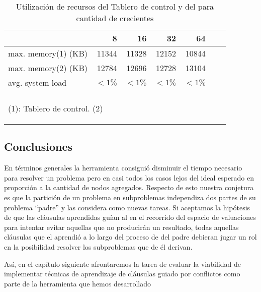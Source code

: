 \begin{table}
	\centering
	\begin{tabular}{lrrrrrr}
		
			\ws 				&	8 		&	16		&	32 		&	64	\\
		\toprule	
			max. memory(1) (KB)	&	11344	&	11328	&	12152	&	10844 \\
			max. memory(2) (KB)	&	12784	&	12696	&	12728 	&	13104 \\
			avg. system load	&	$<1\%$	&	$<1\%$	&	$<1\%$ 	&	$<1\%$ \\
		\bottomrule \\
		\multicolumn{5}{l}{\begin{tiny}(1): Tablero de control. (2) \master \end{tiny}}
	\end{tabular}
	\caption{Utilización de recursos del Tablero de control y del \master para cantidad de \ws crecientes}
	\label{tab:incremental}
\end{table}

\subsection{Conclusiones}

En términos generales la herramienta consiguió disminuir el tiempo necesario
para resolver un problema pero en casi todos los casos lejos del ideal
esperado en proporción a la cantidad de nodos agregados. Respecto de esto
nuestra conjetura es que la partición de un problema en subproblemas
independiza dos partes de su problema ``padre'' y las considera como nuevas
tareas. Si aceptamos la hipótesis de que las cláusulas aprendidas guían al
\ssolver en el recorrido del espacio de valuaciones para intentar evitar
aquellas que no producirán un resultado, todas aquellas cláusulas que el
\ssolver aprendió a lo largo del proceso de \solving del padre debieran jugar
un rol en la posibilidad resolver los subproblemas que de él derivan.

Así, en el capítulo siguiente afrontaremos la tarea de evaluar la viabilidad
de implementar técnicas de aprendizaje de cláusulas guiado por conflictos como
parte de la herramienta que hemos desarrollado
